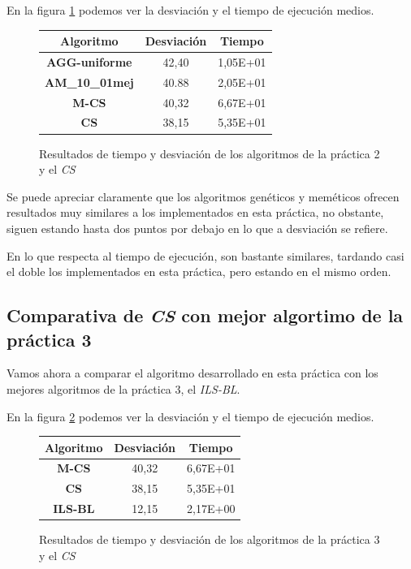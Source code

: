 En la figura \ref{tab:compP2} podemos ver la desviación y el tiempo de ejecución medios.

\begin{figure}[H]
    \centering
    \begin{tabular}{|c|c|c|}
        \hline
        Algoritmo & \textbf{Desviación} & \textbf{Tiempo}\\
        \hline
        \textbf{AGG-uniforme} & 42,40 & 1,05E+01\\
        \hline
        \textbf{AM\_10\_01mej} & 40.88 & 2,05E+01\\
        \hline
        \textbf{M-CS} & 40,32 & 6,67E+01\\
        \hline
        \textbf{CS} & 38,15 & 5,35E+01\\
        \hline
    \end{tabular}
    \caption{Resultados de tiempo y desviación de los algoritmos de la práctica 2 y el \textit{CS}}
    \label{tab:compP2}
\end{figure}

Se puede apreciar claramente que los algoritmos genéticos y meméticos ofrecen resultados muy similares a los implementados en esta práctica, no obstante, siguen estando hasta dos puntos por debajo en lo que a desviación se refiere.

En lo que respecta al tiempo de ejecución, son bastante similares, tardando casi el doble los implementados en esta práctica, pero estando en el mismo orden.

\subsection{Comparativa de \textit{CS} con mejor algortimo de la práctica 3}

Vamos ahora a comparar el algoritmo desarrollado en esta práctica con los mejores algoritmos de la práctica 3, el \textit{ILS-BL}.

En la figura \ref{tab:compP3} podemos ver la desviación y el tiempo de ejecución medios.

\begin{figure}[H]
    \centering
    \begin{tabular}{|c|c|c|}
        \hline
        Algoritmo & \textbf{Desviación} & \textbf{Tiempo}\\
        \hline
        \textbf{M-CS} & 40,32 & 6,67E+01\\
        \hline
        \textbf{CS} & 38,15 & 5,35E+01\\
        \hline
        \textbf{ILS-BL} & 12,15 & 2,17E+00\\
        \hline
    \end{tabular}
    \caption{Resultados de tiempo y desviación de los algoritmos de la práctica 3 y el \textit{CS}}
    \label{tab:compP3}
\end{figure}

